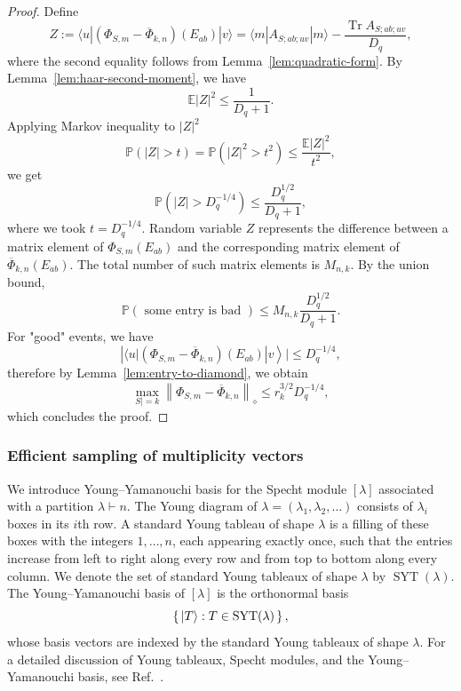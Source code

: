 \documentclass[10pt,twocolumn,superscriptaddress,aps,amsmath,amssymb,citeautoscript,floatfix,prx]{revtex4-2}
\theoremstyle{plain}
\theoremstyle{plain}
\theoremstyle{plain}
\theoremstyle{plain}
\theoremstyle{plain}
\theoremstyle{plain}
\theoremstyle{plain}
\theoremstyle{definition}
\theoremstyle{plain}
\begin{document}
\begin{appendix}
\begin{proof}
    Define
    \[
        Z:=\langle u|\left(\Phi_{S, m}-\overline{\Phi}_{k,n}\right)\left(E_{a b}\right)|v\rangle=\langle m| A_{S ; a b ; u v}|m\rangle-\frac{\operatorname{Tr} A_{S ; a b ; u v}}{D_q},
    \]
    where the second equality follows from Lemma~\ref{lem:quadratic-form}. By Lemma~\ref{lem:haar-second-moment}, we have
    \[
        \mathbb{E}|Z|^2 \leq \frac{1}{D_q+1}.
    \]
    Applying Markov inequality to $|Z|^2$
    \[
        \mathbb{P}(|Z|>t)=\mathbb{P}\left(|Z|^2>t^2\right) \leq \frac{\mathbb{E}|Z|^2}{t^2},
    \]
    we get
    \[
        \mathbb{P}(|Z|>D_q^{-1/4}) \leq \frac{D_q^{1/2}}{D_q+1},
    \]
    where we took $t=D_q^{-1/4}$. Random variable $Z$ represents the difference between a matrix element of $\Phi_{S, m}\left(E_{a b}\right)$ and the corresponding matrix element of $\overline{\Phi}_{k,n}\left(E_{a b}\right)$. 
    The total number of such matrix elements is $M_{n,k}$.  By the union bound,
    \[
    \mathbb{P}(\text { some entry is bad }) \leq M_{n, k} \frac{D_q^{1 / 2}}{D_q+1}.
    \]
    For "good" events, we have
    \[
    \left.\left|\langle u|\left(\Phi_{S, m}-\overline{\Phi}_{k,n}\right)\left(E_{a b}\right)\right| v\right\rangle \mid \leq D_q^{-1 / 4},
    \]
    therefore by Lemma~\ref{lem:entry-to-diamond}, we obtain
    \[
    \max _{S \mid=k}\left\|\Phi_{S, m}-\overline{\Phi}_{k,n}\right\|_{\diamond} \leq r_k^{3 / 2} D_q^{-1 / 4},
    \]
    which concludes the proof.
\end{proof}

\subsubsection{Efficient sampling of multiplicity vectors}\label{sec:efficient_sampling}

We introduce Young--Yamanouchi basis for the Specht module $[\lambda]$ associated with a partition $\lambda\vdash n$. 
The Young diagram of $\lambda=(\lambda_1,\lambda_2,\ldots)$ consists of $\lambda_i$ boxes in its $i$th row. 
A standard Young tableau of shape $\lambda$ is a filling of these boxes with the integers $1,\ldots,n$, each appearing exactly once, such that the entries increase from left to right along every row and from top to bottom along every column. 
We denote the set of standard Young tableaux of shape $\lambda$ by $\operatorname{SYT}(\lambda)$. 
The Young--Yamanouchi basis of $[\lambda]$ is the orthonormal basis
\[
    \left\{\,\ket{T}:T\in\operatorname{SYT}(\lambda)\,\right\},
\]
whose basis vectors are indexed by the standard Young tableaux of shape $\lambda$. 
For a detailed discussion of Young tableaux, Specht modules, and the Young--Yamanouchi basis, see Ref.~\cite{Sagan2001}.


\end{appendix}
\end{document}
